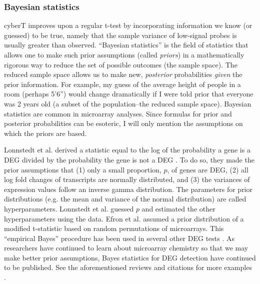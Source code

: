 \subsubsection{Bayesian statistics}
cyberT improves upon a regular t-test by incorporating
information we know (or guessed) to be true, namely that the sample variance of low-signal
probes is usually greater than observed. ``Bayesian statistics'' is the field
of statistics that allows one to make such prior assumptions (called \textit{priors})
in a mathematically rigorous way
to reduce the set of possible outcomes (the sample space). The reduced sample
space allows us to make new, \textit{posterior} 
probabilities \textit{given} the prior information. For example, my
guess of the average height of people in a room (perhaps 5'6'') would
change dramatically if I were told prior that everyone 
was 2 years old (a subset of the population--the reduced sample space). Bayesian statistics
are common in microarray analyses. Since formulas
for prior and posterior probabilities can be esoteric, I will only
mention the assumptions on which the priors are based.

Lonnstedt et al. derived a statistic equal to the log of the 
probability a gene is a DEG divided by the probability the gene is not a DEG \cite{Lonnstedt:2002wu}.
To do so, they made the prior assumptions that (1) only a small proportion, $p$, of 
genes are DEG, (2) all log fold changes of transcripts are normally distributed,
and (3) the variances of expression values follow an inverse gamma distribution.
The parameters for prior
distributions (e.g. the mean and variance of 
the normal distribution) are 
called hyperparameters. Lonnstedt et al. guessed $p$ and estimated
the other hyperparameters using the data. Efron et al.
assumed a prior distribution of a modified t-statistic
based on random permutations of microarrays. This ``empirical
Bayes'' procedure has been used in several other DEG tests \cite{Efron:2001uu}.
As researchers have continued to learn about microarray chemistry so that
we may make better prior assumptions, Bayes statistics for DEG detection
have continued to be published. See
the aforementioned reviews and citations for more examples 
\cite{Newton:2001te,Murie:2008iz,Jain:2003kh,Yu:2011vo,
Astrand:2008jk,Newton:2004cp,Gottardo:2003hb,Efron:2002bz,Townsend:2002tf}.


